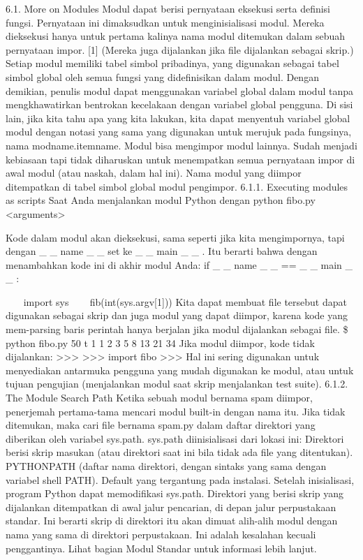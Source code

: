 6.1. More on Modules 
Modul dapat berisi pernyataan eksekusi serta definisi fungsi. Pernyataan ini dimaksudkan untuk menginisialisasi modul. Mereka dieksekusi hanya untuk pertama kalinya nama modul ditemukan dalam sebuah pernyataan impor. [1] (Mereka juga dijalankan jika file dijalankan sebagai skrip.)  
Setiap modul memiliki tabel simbol pribadinya, yang digunakan sebagai tabel simbol global oleh semua fungsi yang didefinisikan dalam modul. Dengan demikian, penulis modul dapat menggunakan variabel global dalam modul tanpa mengkhawatirkan bentrokan kecelakaan dengan variabel global pengguna. Di sisi lain, jika kita tahu apa yang kita lakukan, kita dapat menyentuh variabel global modul dengan notasi yang sama yang digunakan untuk merujuk pada fungsinya, nama modname.itemname. 
Modul bisa mengimpor modul lainnya. Sudah menjadi kebiasaan tapi tidak diharuskan untuk menempatkan semua pernyataan impor di awal modul (atau naskah, dalam hal ini). Nama modul yang diimpor ditempatkan di tabel simbol global modul pengimpor.  
6.1.1. Executing modules as scripts  
Saat Anda menjalankan modul Python dengan  
python fibo.py <arguments>  

Kode dalam modul akan dieksekusi, sama seperti jika kita mengimpornya, tapi dengan    \_     \_  name   \_     \_   set ke    \_     \_  main   \_     \_  . Itu berarti bahwa dengan menambahkan kode ini di akhir modul Anda: 
if    \_     \_  name   \_     \_   ==    \_     \_  main   \_     \_  :  

~~~ import sys 
~~~ fib(int(sys.argv[1])) 
Kita dapat membuat file tersebut dapat digunakan sebagai skrip dan juga modul yang dapat diimpor, karena kode yang mem-parsing baris perintah hanya berjalan jika modul dijalankan sebagai file.  
   \$   python fibo.py 50 t 
1 1 2 3 5 8 13 21 34  
Jika modul diimpor, kode tidak dijalankan:  
>>>  
>>> import fibo  
>>>  
Hal ini sering digunakan untuk menyediakan antarmuka pengguna yang mudah digunakan ke modul, atau untuk tujuan pengujian (menjalankan modul saat skrip menjalankan test suite). 
6.1.2. The Module Search Path 
Ketika sebuah modul bernama spam diimpor, penerjemah pertama-tama mencari modul built-in dengan nama itu. Jika tidak ditemukan, maka cari file bernama spam.py dalam daftar direktori yang diberikan oleh variabel sys.path. sys.path diinisialisasi dari lokasi ini:  
Direktori berisi skrip masukan (atau direktori saat ini bila tidak ada file yang ditentukan).  
PYTHONPATH (daftar nama direktori, dengan sintaks yang sama dengan variabel shell PATH).  
Default yang tergantung pada instalasi. 
Setelah inisialisasi, program Python dapat memodifikasi sys.path. Direktori yang berisi skrip yang dijalankan ditempatkan di awal jalur pencarian, di depan jalur perpustakaan standar. Ini berarti skrip di direktori itu akan dimuat alih-alih modul dengan nama yang sama di direktori perpustakaan. Ini adalah kesalahan kecuali penggantinya. Lihat bagian Modul Standar untuk informasi lebih lanjut.  

